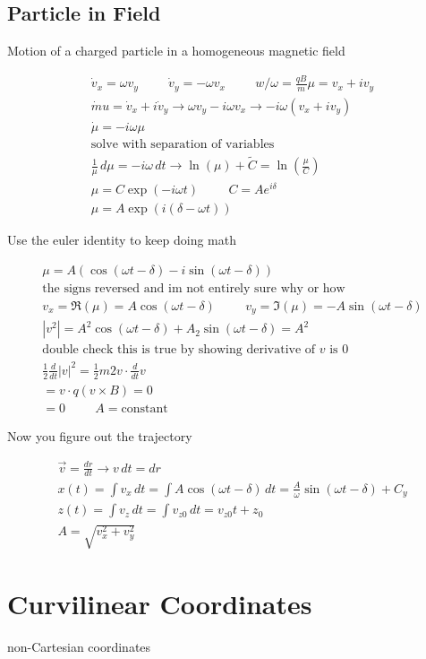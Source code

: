 \documentclass[fleqn]{report}
\newcommand{\hp}{\hspace{1cm}}
\newcommand{\equations} [1] {
\begin{gather*}
#1
\end{gather*}
}
\begin{document}
\subsection{Particle in Field}
Motion of a charged particle in a homogeneous magnetic field
\equations{
\dot v_x = \omega v_y
\hp 
\dot v_y = - \omega v_x
\hp
w / \omega = \frac{qB}{m}
\mu = v_x + i v_y
\\
\dot mu = \dot v_x + i \dot v_y
\longrightarrow
\omega v_y - i \omega v_x
\rightarrow
-i \omega (v_x + i v_y)
\\
\dot \mu = -i \omega \mu
\\
\textrm{solve with separation of variables}
\\
\frac{1}{\mu} \, d \mu = - i \omega \, dt
\rightarrow
\ln(\mu) + \tilde{C} = \ln(\frac{\mu}{C})
\\
\mu = C \exp(-i \omega t)
\hp
C = A e^{i \delta}
\\
\mu = A \exp(i(\delta - \omega t))
}
Use the euler identity to keep doing math
\equations{
	\mu = A(\cos(\omega t - \delta) - i \sin(\omega t - \delta))
	\\
	\textrm{the signs reversed and im not entirely sure why or how}
	\\
	v_x = \Re(\mu) = A \cos(\omega t - \delta)
	\hp
	v_y = \Im(\mu) = -A \sin(\omega t - \delta)
    \\
    |v^2| = A^2 \cos(\omega t - \delta) + A_2 \sin(\omega t - \delta)
    = A^2
    \\
    \textrm{double check this is true by 
    showing derivative of $v$ is 0}
    \\
    \frac{1}{2} \frac{d}{dt}|v|^2 = 
    \frac{1}{2}m 2v \cdot \frac{d}{dt}v
    \\
    = v \cdot q(v \times B) = 0
    \\
    = 0 \hp A = \textrm{constant}
}

Now you figure out the trajectory
\equations{
    \vec v = \frac{dr}{dt} \rightarrow v \, dt = dr 
    \\
    x(t) = \int v_x \, dt = \int A \cos(\omega t - \delta) \, dt 
    =
    \frac{A}{\omega} \sin(\omega t - \delta) + C_y
    \\
    z(t) = \int v_z \, dt = \int v_{z0} \, dt = 
    v_{z0} t + z_0
    \\
    A = \sqrt{v_x^2 + v_y^2}
}

\section{Curvilinear Coordinates}
non-Cartesian coordinates 
\end{document}
